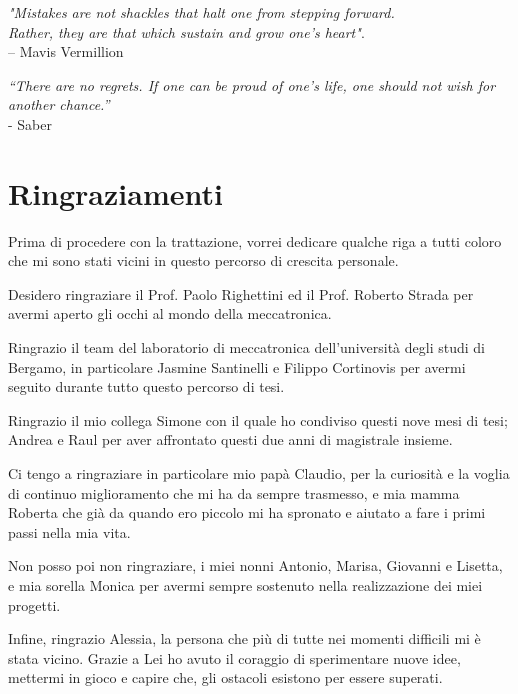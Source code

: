 \begin{flushright}

    \par   %
    \vspace{3\baselineskip}
    \textit{"Mistakes are not shackles that halt one from stepping forward. \\Rather, they are that which sustain and grow one’s heart"}. \\– Mavis Vermillion

\par
\vspace{3\baselineskip}
\textit{“There are no regrets. If one can be proud of one’s life, one should not wish for another chance.”} \\ - Saber

\end{flushright}
\vfill
\section*{Ringraziamenti}
Prima di procedere con la trattazione, vorrei dedicare qualche riga a tutti coloro che mi sono stati vicini in questo percorso di crescita personale.
\par Desidero ringraziare il Prof. Paolo Righettini ed il Prof. Roberto Strada per avermi aperto gli occhi al mondo della meccatronica.
\par Ringrazio il team del laboratorio di meccatronica dell'università degli studi di Bergamo, in particolare Jasmine Santinelli e Filippo Cortinovis per avermi seguito durante tutto questo percorso di tesi.
\par Ringrazio il mio collega Simone con il quale ho condiviso questi nove mesi di tesi; Andrea e Raul per aver affrontato questi due anni di magistrale insieme.
\par Ci tengo a ringraziare in particolare mio papà Claudio, per la curiosità e la voglia di continuo miglioramento che mi ha da sempre trasmesso, e mia mamma Roberta che già da quando ero piccolo mi ha spronato e aiutato a fare i primi passi nella mia vita.
\par Non posso poi non ringraziare, i miei nonni Antonio, Marisa, Giovanni e Lisetta, e mia sorella Monica per avermi sempre sostenuto nella realizzazione dei miei progetti.
\par Infine, ringrazio Alessia, la persona che più di tutte nei momenti difficili mi è stata vicino. Grazie a Lei ho avuto il coraggio di sperimentare nuove idee, mettermi in gioco e capire che, gli ostacoli esistono per essere superati.